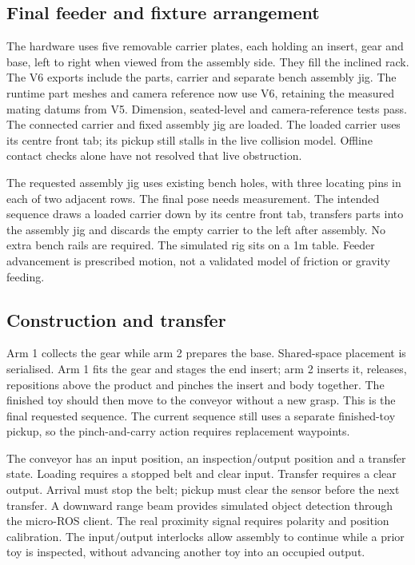 \documentclass{article}
\begin{document}
\subsection{Final feeder and fixture arrangement}
The hardware uses five removable carrier plates, each holding an insert, gear and base, left to right when viewed from the assembly side. They fill the inclined rack. The V6 exports include the parts, carrier and separate bench assembly jig. The runtime part meshes and camera reference now use V6, retaining the measured mating datums from V5. Dimension, seated-level and camera-reference tests pass. The connected carrier and fixed assembly jig are loaded. The loaded carrier uses its centre front tab; its pickup still stalls in the live collision model. Offline contact checks alone have not resolved that live obstruction.

The requested assembly jig uses existing bench holes, with three locating pins in each of two adjacent rows. The final pose needs measurement. The intended sequence draws a loaded carrier down by its centre front tab, transfers parts into the assembly jig and discards the empty carrier to the left after assembly. No extra bench rails are required. The simulated rig sits on a 1m table. Feeder advancement is prescribed motion, not a validated model of friction or gravity feeding.

\subsection{Construction and transfer}
Arm 1 collects the gear while arm 2 prepares the base. Shared-space placement is serialised. Arm 1 fits the gear and stages the end insert; arm 2 inserts it, releases, repositions above the product and pinches the insert and body together. The finished toy should then move to the conveyor without a new grasp. This is the final requested sequence. The current sequence still uses a separate finished-toy pickup, so the pinch-and-carry action requires replacement waypoints.

The conveyor has an input position, an inspection/output position and a transfer state. Loading requires a stopped belt and clear input. Transfer requires a clear output. Arrival must stop the belt; pickup must clear the sensor before the next transfer. A downward range beam provides simulated object detection through the micro-ROS client. The real proximity signal requires polarity and position calibration. The input/output interlocks allow assembly to continue while a prior toy is inspected, without advancing another toy into an occupied output.
\end{document}
